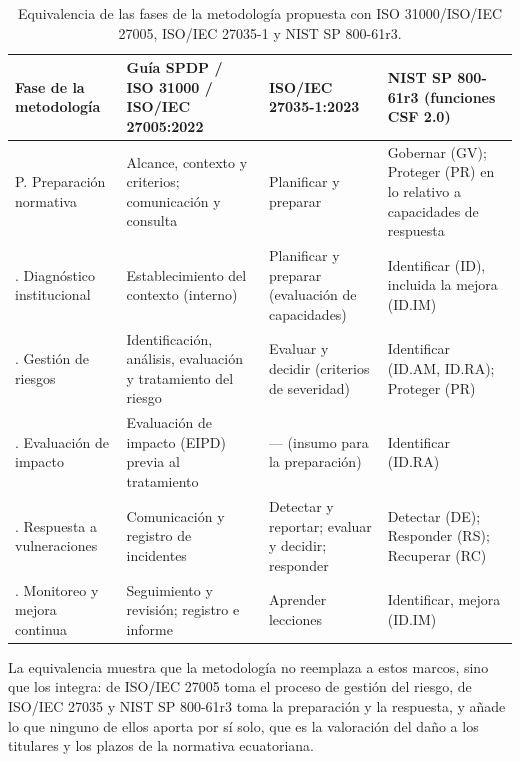 \begin{table}[htbp]
  \centering
  \caption{Equivalencia de las fases de la metodología propuesta con ISO 31000/ISO/IEC 27005, ISO/IEC 27035-1 y NIST SP 800-61r3.}
  \label{tab:equivalencia_marcos}
  \scriptsize
  \renewcommand{\arraystretch}{1.2}
  \begin{tabularx}{\textwidth}{|>{\raggedright\arraybackslash}p{2.3cm}|L|L|L|}
    \hline
    \textbf{Fase de la metodología} & \textbf{Guía SPDP / ISO 31000 / ISO/IEC 27005:2022} & \textbf{ISO/IEC 27035-1:2023} & \textbf{NIST SP 800-61r3 (funciones CSF 2.0)} \\
    \hline
    P. Preparación normativa & Alcance, contexto y criterios; comunicación y consulta & Planificar y preparar & Gobernar (GV); Proteger (PR) en lo relativo a capacidades de respuesta \\
    . Diagnóstico institucional & Establecimiento del contexto (interno) & Planificar y preparar (evaluación de capacidades) & Identificar (ID), incluida la mejora (ID.IM) \\
    . Gestión de riesgos & Identificación, análisis, evaluación y tratamiento del riesgo & Evaluar y decidir (criterios de severidad) & Identificar (ID.AM, ID.RA); Proteger (PR) \\
    . Evaluación de impacto & Evaluación de impacto (EIPD) previa al tratamiento & --- (insumo para la preparación) & Identificar (ID.RA) \\
    . Respuesta a vulneraciones & Comunicación y registro de incidentes & Detectar y reportar; evaluar y decidir; responder & Detectar (DE); Responder (RS); Recuperar (RC) \\
    . Monitoreo y mejora continua & Seguimiento y revisión; registro e informe & Aprender lecciones & Identificar, mejora (ID.IM) \\
    \hline
  \end{tabularx}
  \raggedright
\end{table}

La equivalencia muestra que la metodología no reemplaza a estos marcos, sino que los integra: de ISO/IEC 27005 toma el proceso de gestión del riesgo, de ISO/IEC 27035 y NIST SP 800-61r3 toma la preparación y la respuesta, y añade lo que ninguno de ellos aporta por sí solo, que es la valoración del daño a los titulares y los plazos de la normativa ecuatoriana.


